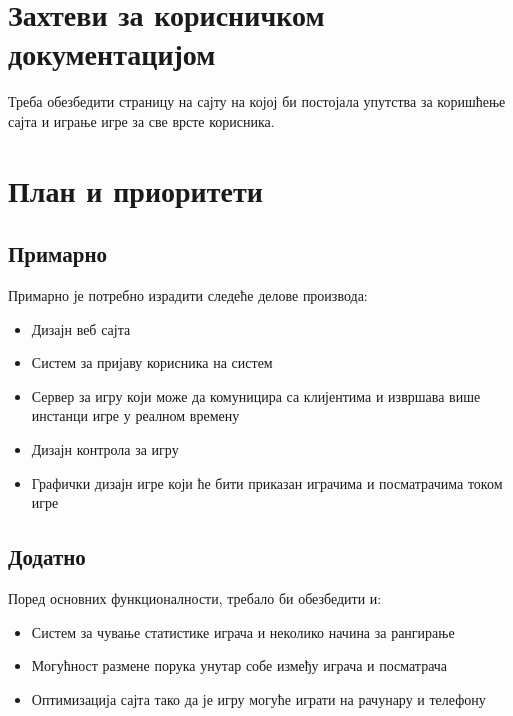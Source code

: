 \section{Захтеви за корисничком документацијом}
Треба обезбедити страницу на сајту на којој би постојала упутства за коришћење сајта и играње игре за све врсте
корисника.



\section{План и приоритети}

\subsection{Примарно}
Примарно је потребно израдити следеће делове производа:
\begin{itemize}

\item Дизајн веб сајта

\item Систем за пријаву корисника на систем

\item Сервер за игру који може да комуницира са клијентима и извршава више инстанци игре у реалном времену

\item Дизајн контрола за игру

\item Графички дизајн игре који ће бити приказан играчима и посматрачима током игре

\end{itemize}

\subsection{Додатно}
Поред основних функционалности, требало би обезбедити и:
\begin{itemize}
    
    \item Систем за чување статистике играча и неколико начина за рангирање

    \item Могућност размене порука унутар собе између играча и посматрача

\item Оптимизација сајта тако да је игру могуће играти на рачунару и телефону    
\end{itemize}
